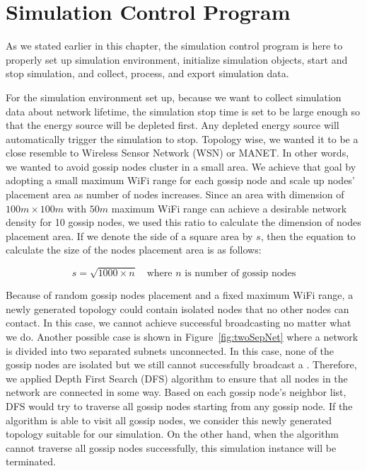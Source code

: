 \section{Simulation Control Program}

As we stated earlier in this chapter, the simulation control program is here to properly set up simulation environment, initialize simulation objects, start and stop simulation, and collect, process, and export simulation data.

For the simulation environment set up, because we want to collect simulation data about network lifetime, the simulation stop time is set to be large enough so that the energy source will be depleted first. Any depleted energy source will automatically trigger the simulation to stop. Topology wise, we wanted it to be a close resemble to Wireless Sensor Network (WSN) or MANET. In other words, we wanted to avoid gossip nodes cluster in a small area. We achieve that goal by adopting a small maximum WiFi range for each gossip node and scale up nodes' placement area as number of nodes increases. Since an area with dimension of $100m \times 100m$ with $50m$ maximum WiFi range can achieve a desirable network density for 10 gossip nodes, we used this ratio to calculate the dimension of nodes placement area. If we denote the side of a square area by $s$, then the equation to calculate the size of the nodes placement area is as follows:

\[ s=\sqrt{1000\times n} \quad \mbox{where } n \mbox{ is number of gossip nodes}\]

Because of random gossip nodes placement and a fixed maximum WiFi range, a newly generated topology could contain isolated nodes that no other nodes can contact. In this case, we cannot achieve successful broadcasting no matter what we do. Another possible case is shown in Figure~\ref{fig:twoSepNet} where a network is divided into two separated subnets unconnected. In this case, none of the gossip nodes are isolated but we still cannot successfully broadcast a \msg. Therefore, we applied Depth First Search (DFS) algorithm to ensure that all nodes in the network are connected in some way. Based on each gossip node's neighbor list, DFS would try to traverse all gossip nodes starting from any gossip node. If the algorithm is able to visit all gossip nodes, we consider this newly generated topology suitable for our simulation. On the other hand, when the algorithm cannot traverse all gossip nodes successfully, this simulation instance will be terminated.

